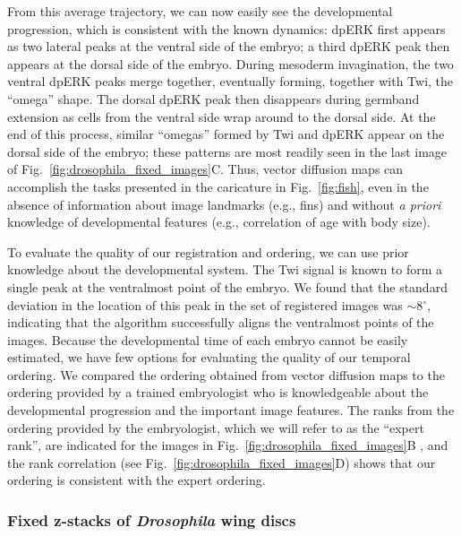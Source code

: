 \documentclass[twocolumn, 10pt]{article}
\newcommand{\fig}[0]{Fig.}
\begin{document}
From this average trajectory, we can now easily see the developmental progression, which is consistent with the known dynamics: 
dpERK first appears as two lateral peaks at the ventral side of the embryo; a third dpERK peak then appears at the dorsal side of the embryo.
%
During mesoderm invagination, the two ventral dpERK peaks merge together, eventually forming, together with Twi, the ``omega'' shape.
%
The dorsal dpERK peak then disappears during germband extension as cells from the ventral side wrap around to the dorsal side.
%
At the end of this process, similar ``omegas'' formed by Twi and dpERK appear on the dorsal side of the embryo; these patterns are most readily seen in the last image of \fig~\ref{fig:drosophila_fixed_images}C.
%
Thus, vector diffusion maps can accomplish the tasks presented in the caricature in \fig~\ref{fig:fish}, even in the absence of information about image landmarks (e.g., fins) and without {\it a priori} knowledge of developmental features (e.g., correlation of age with body size).
%

To evaluate the quality of our registration and ordering, we can use prior knowledge about the developmental system. 
%
The Twi signal is known to form a single peak at the ventralmost point of the embryo. 
%
We found that the standard deviation in the location of this peak in the set of registered images was $\sim$8$^\circ$,
indicating that the algorithm successfully aligns the ventralmost points of the images. 
%
Because the developmental time of each embryo cannot be easily estimated, we have few options for evaluating the quality of our temporal ordering. 
%
We compared the ordering obtained from vector diffusion maps to the ordering provided by a trained embryologist who is knowledgeable about the developmental progression and the important image features.  
%
The ranks from the ordering provided by the embryologist, which we will refer to as the ``expert rank'', are indicated for the images in \fig~\ref{fig:drosophila_fixed_images}B , and the rank correlation (see \fig~\ref{fig:drosophila_fixed_images}D) shows that our ordering is consistent with the expert ordering. 


\subsubsection*{Fixed z-stacks of {\em Drosophila} wing discs}
\end{document}

